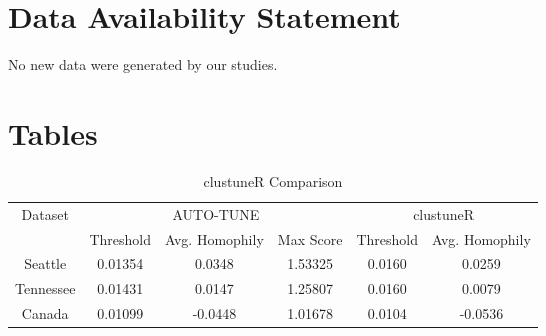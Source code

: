 \documentclass[utf8]{FrontiersinHarvard} %
\begin{document}
\section*{Data Availability Statement}

No new data were generated by our studies.


\nocite{*}


\section*{Tables}

\begin{table}[h]
	\caption{clustuneR Comparison}
	\vspace{8pt}
	\centering
	\label{tab:homophily}
	\begin{tabular}{|c|c|c|c|c|c|}
		\hline
		Dataset   & \multicolumn{3}{c|}{AUTO-TUNE} & \multicolumn{2}{c|}{clustuneR}                                          \\
		\cline{2-6}
		          & Threshold                      & Avg. Homophily                 & Max Score & Threshold & Avg. Homophily \\
		\hline
		Seattle   & 0.01354                        & 0.0348                         & 1.53325   & 0.0160    & 0.0259         \\
		Tennessee & 0.01431                        & 0.0147                         & 1.25807   & 0.0160    & 0.0079         \\
		Canada    & 0.01099                        & -0.0448                        & 1.01678   & 0.0104    & -0.0536        \\
		\hline
	\end{tabular}
\end{table}
\end{document}
